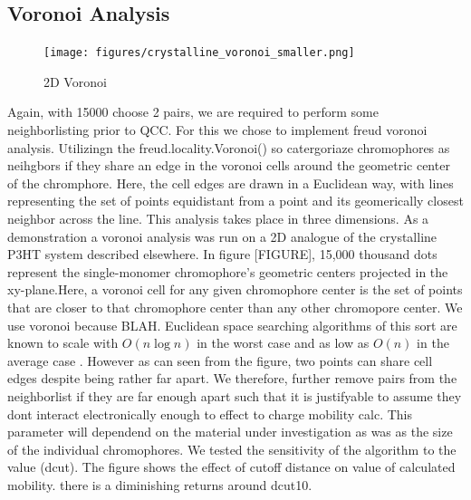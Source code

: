 \subsection{Voronoi Analysis}
\begin{figure}
  \center
  \texttt{[image: figures/crystalline\_voronoi\_smaller.png]} 
  \caption{2D Voronoi}
  \label{fig:2d}
\end{figure}


Again, with 15000 choose 2 pairs, we are required to perform some neighborlisting prior to QCC. For this we chose to
implement freud voronoi analysis. Utilizingn the freud.locality.Voronoi() so catergoriaze chromophores as
neihgbors if they share an edge in the voronoi cells around the geometric center of the chromphore. Here, the
cell edges are drawn in a Euclidean way, with lines representing the set of points equidistant from a point
and its geomerically closest neighbor across the line. This analysis takes place in three dimensions. As a
demonstration a voronoi analysis was run on a 2D analogue of the crystalline P3HT system described elsewhere.
In figure [FIGURE], 15,000 thousand dots represent the single-monomer chromophore's geometric centers projected
in the xy-plane.Here,
a voronoi cell for any given chromophore center is the set of points that are closer to that chromophore
center than any other chromopore center. We use voronoi because BLAH. Euclidean space searching algorithms of
this sort are known to scale with $O(n\log{n})$ in the worst case and as low as $O(n)$ in the average case
\cite{Bentley1980}.
However as can seen from the figure, two points can share cell edges despite being rather far apart. We
therefore, further remove pairs from the neighborlist if they are far enough apart such that it is justifyable
to assume they dont interact electronically enough to effect to charge mobility calc. This parameter will
dependend on the material under investigation as was as the size of the individual chromophores. We tested the
sensitivity of the algorithm to the value (dcut). The figure shows the effect of cutoff distance on value of
calculated mobility. there is a diminishing returns around dcut10. 
